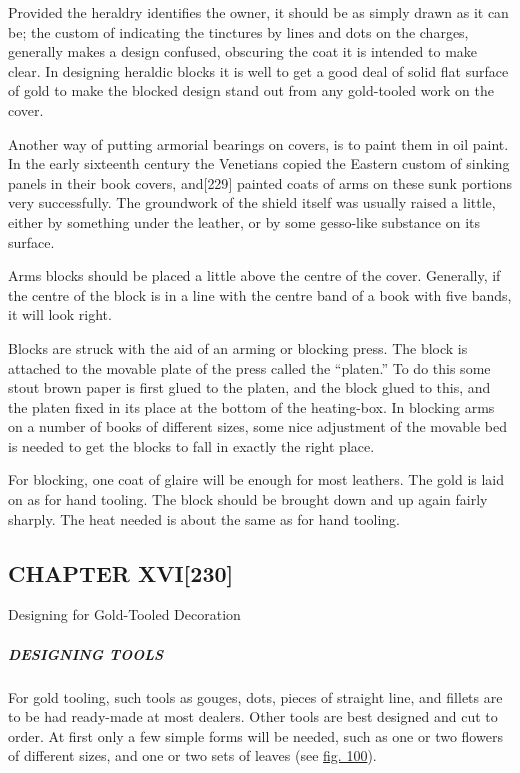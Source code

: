 \documentclass[
]{article}
\begin{document}
Provided the heraldry identifies the owner, it should be as simply drawn
as it can be; the custom of indicating the tinctures by lines and dots
on the charges, generally makes a design confused, obscuring the coat it
is intended to make clear. In designing heraldic blocks it is well to
get a good deal of solid flat surface of gold to make the blocked design
stand out from any gold-tooled work on the cover.

Another way of putting armorial bearings on covers, is to paint them in
oil paint. In the early sixteenth century the Venetians copied the
Eastern custom of sinking panels in their book covers,
and{\protect\hypertarget{Page_229}{}{{[}229{]}}} painted coats of arms
on these sunk portions very successfully. The groundwork of the shield
itself was usually raised a little, either by something under the
leather, or by some gesso-like substance on its surface.

Arms blocks should be placed a little above the centre of the cover.
Generally, if the centre of the block is in a line with the centre band
of a book with five bands, it will look right.

Blocks are struck with the aid of an arming or blocking press. The block
is attached to the movable plate of the press called the ``platen.'' To
do this some stout brown paper is first glued to the platen, and the
block glued to this, and the platen fixed in its place at the bottom of
the heating-box. In blocking arms on a number of books of different
sizes, some nice adjustment of the movable bed is needed to get the
blocks to fall in exactly the right place.

For blocking, one coat of glaire will be enough for most leathers. The
gold is laid on as for hand tooling. The block should be brought down
and up again fairly sharply. The heat needed is about the same as for
hand tooling.

\hypertarget{chapter-xvi230}{%
\subsection[CHAPTER
XVI]{\texorpdfstring{\protect\hypertarget{CHAPTER_XVI}{}{}CHAPTER
XVI{\protect\hypertarget{Page_230}{}{{[}230{]}}}}{CHAPTER XVI{[}230{]}}}\label{chapter-xvi230}}

Designing for Gold-Tooled Decoration

\hypertarget{designing-tools}{%
\subparagraph{DESIGNING TOOLS}\label{designing-tools}}

{For} gold tooling, such tools as gouges, dots, pieces of straight line,
and fillets are to be had ready-made at most dealers. Other tools are
best designed and cut to order. At first only a few simple forms will be
needed, such as one or two flowers of different sizes, and one or two
sets of leaves (see \protect\hyperlink{Fig_100}{fig. 100}).
\end{document}
